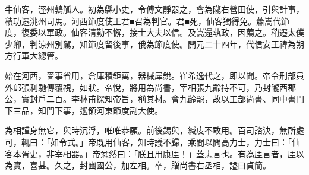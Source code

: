 \begin{pinyinscope}
 牛仙客，涇州鶉觚人。初為縣小史，令傅文靜器之，會為隴右營田使，引與計事，積功遷洮州司馬。河西節度使王君■召為判官。君■死，仙客獨得免。蕭嵩代節度，復委以軍政。仙客清勤不懈，接士大夫以信。及嵩還執政，因薦之。稍遷太僕少卿，判涼州別駕，知節度留後事，俄為節度使。開元二十四年，代信安王禕為朔方行軍大總管。



 始在河西，嗇事省用，倉庫積鉅萬，器械犀銳。崔希逸代之，即以聞。帝令刑部員外郎張利馳傳覆視，如狀。帝悅，將用為尚書，宰相張九齡持不可，乃封隴西郡公，實封戶二百。李林甫探知帝旨，稱其材。會九齡罷，故以工部尚書、同中書門下三品，知門下事，遙領河東節度副大使。



 為相謹身無它，與時沉浮，唯唯恭願。前後錫與，緘庋不敢用。百司諮決，無所處可，輒曰：「如令式。」帝既用仙客，知時議不歸，乘間以問高力士，力士曰：「仙客本胥史，非宰相器。」帝忿然曰：「朕且用康厓！」蓋恚言也。有為厓言者，厓以為實，喜甚。久之，封豳國公，加左相。卒，贈尚書右丞相，謚曰貞簡。



\end{pinyinscope}